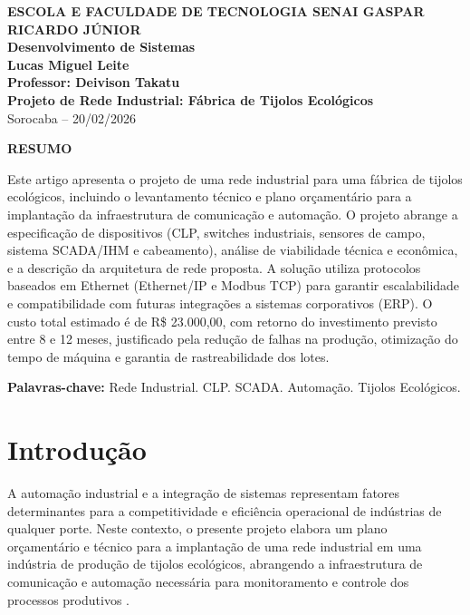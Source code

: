 \documentclass[12pt,a4paper,oneside]{article}
\begin{document}
\begin{center}
  \textbf{\large ESCOLA E FACULDADE DE TECNOLOGIA SENAI GASPAR RICARDO JÚNIOR}\\
  \textbf{Desenvolvimento de Sistemas}\\[1cm]
  \textbf{\Large Lucas Miguel Leite}\\[0.5cm]
  \textbf{Professor: Deivison Takatu}\\[2cm]
  \textbf{\LARGE\textbf{Projeto de Rede Industrial: Fábrica de Tijolos Ecológicos}}\\[1cm]
  Sorocaba -- 20/02/2026
\end{center}

\vspace{1cm}

\begin{center}
  \textbf{RESUMO}
\end{center}

Este artigo apresenta o projeto de uma rede industrial para uma fábrica de tijolos ecológicos, incluindo o levantamento técnico e plano orçamentário para a implantação da infraestrutura de comunicação e automação. O projeto abrange a especificação de dispositivos (CLP, switches industriais, sensores de campo, sistema SCADA/IHM e cabeamento), análise de viabilidade técnica e econômica, e a descrição da arquitetura de rede proposta. A solução utiliza protocolos baseados em Ethernet (Ethernet/IP e Modbus TCP) para garantir escalabilidade e compatibilidade com futuras integrações a sistemas corporativos (ERP). O custo total estimado é de R\$ 23.000,00, com retorno do investimento previsto entre 8 e 12 meses, justificado pela redução de falhas na produção, otimização do tempo de máquina e garantia de rastreabilidade dos lotes.

\vspace{0.5cm}
\textbf{Palavras-chave:} Rede Industrial. CLP. SCADA. Automação. Tijolos Ecológicos.

\newpage

\section{Introdução}

A automação industrial e a integração de sistemas representam fatores determinantes para a competitividade e eficiência operacional de indústrias de qualquer porte. Neste contexto, o presente projeto elabora um plano orçamentário e técnico para a implantação de uma rede industrial em uma indústria de produção de tijolos ecológicos, abrangendo a infraestrutura de comunicação e automação necessária para monitoramento e controle dos processos produtivos \cite{albuquerque2009}.
\end{document}
